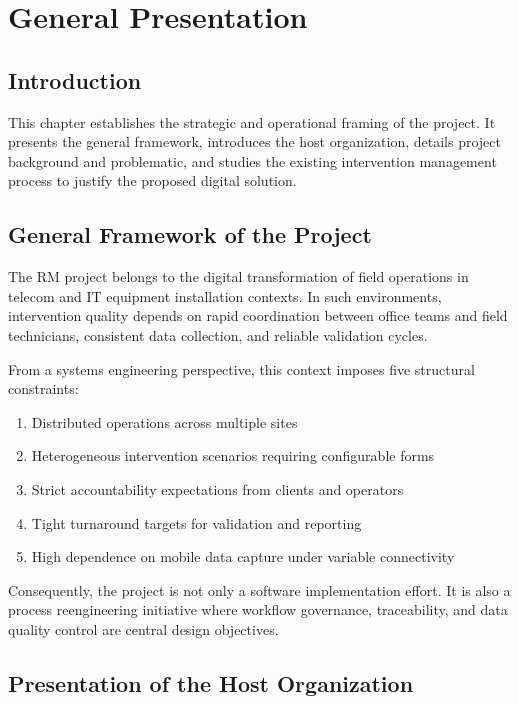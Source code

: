 \chapter{General Presentation}

\section{Introduction}

This chapter establishes the strategic and operational framing of the project. It presents the general framework, introduces the host organization, details project background and problematic, and studies the existing intervention management process to justify the proposed digital solution.

\section{General Framework of the Project}

The RM project belongs to the digital transformation of field operations in telecom and IT equipment installation contexts. In such environments, intervention quality depends on rapid coordination between office teams and field technicians, consistent data collection, and reliable validation cycles.

From a systems engineering perspective, this context imposes five structural constraints:

\begin{enumerate}
\item Distributed operations across multiple sites
\item Heterogeneous intervention scenarios requiring configurable forms
\item Strict accountability expectations from clients and operators
\item Tight turnaround targets for validation and reporting
\item High dependence on mobile data capture under variable connectivity
\end{enumerate}

Consequently, the project is not only a software implementation effort. It is also a process reengineering initiative where workflow governance, traceability, and data quality control are central design objectives.

\section{Presentation of the Host Organization}

